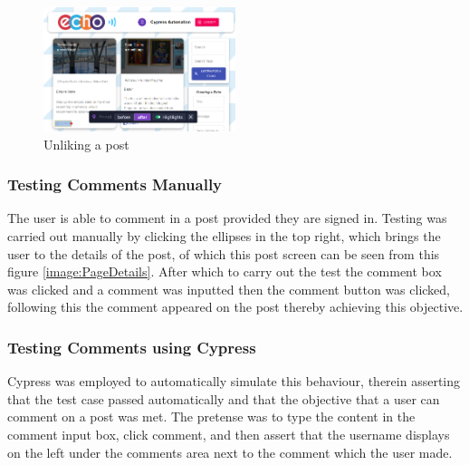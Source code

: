\begin{figure}[h!]
    \centering
    \includegraphics[width=0.5\textwidth]{images/Unliking.png}
    \caption{Unliking a post}
    \label{image:Unliking}
\end{figure}

\newpage
\subsubsection{Testing Comments Manually}
The user is able to comment in a post provided they are signed in. Testing was carried out manually by clicking the ellipses in the top right, which brings the user to the details of the post, of which this post screen can be seen from this figure \ref{image:PageDetails}. After which to carry out the test the comment box was clicked and a comment was inputted then the comment button was clicked, following this the comment appeared on the post thereby achieving this objective.

\subsubsection{Testing Comments using Cypress}
Cypress was employed to automatically simulate this behaviour, therein asserting that the test case passed automatically and that the objective that a user can comment on a post was met. The pretense was to type the content in the comment input box, click comment, and then assert that the username displays on the left under the comments area next to the comment which the user made.

